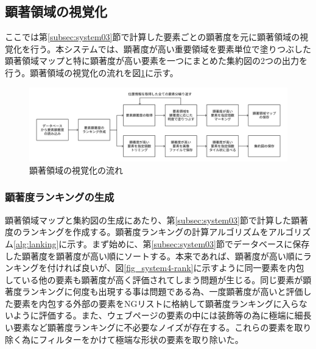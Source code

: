 \subsection{顕著領域の視覚化}\label{subsec:system04}
\par ここでは第\ref{subsec:system03}節で計算した要素ごとの顕著度を元に顕著領域の視覚化を行う。本システムでは、顕著度が高い重要領域を要素単位で塗りつぶした顕著領域マップと特に顕著度が高い要素を一つにまとめた集約図の2つの出力を行う。顕著領域の視覚化の流れを図\ref{fig_system04}に示す。

\begin{figure}[H]
    \centering
    \includegraphics[width=12cm]{figures/06_process04.jpg}
    \caption{顕著領域の視覚化の流れ}
    \label{fig_system04}
\end{figure}

\subsubsection{顕著度ランキングの生成}\label{subsec:system04-1}
\par 顕著領域マップと集約図の生成にあたり、第\ref{subsec:system03}節で計算した顕著度のランキングを作成する。顕著度ランキングの計算アルゴリズムをアルゴリズム\ref{alg:lanking}に示す。まず始めに、第\ref{subsec:system03}節でデータベースに保存した顕著度を顕著度が高い順にソートする。本来であれば、顕著度が高い順にランキングを付ければ良いが、図\ref{fig_system4-rank}に示すように同一要素を内包している他の要素も顕著度が高く評価されてしまう問題が生じる。同じ要素が顕著度ランキングに何度も出現する事は問題である為、一度顕著度が高いと評価した要素を内包する外部の要素をNGリストに格納して顕著度ランキングに入らないように評価する。また、ウェブページの要素の中には装飾等の為に極端に細長い要素など顕著度ランキングに不必要なノイズが存在する。これらの要素を取り除く為にフィルターをかけて極端な形状の要素を取り除いた。


